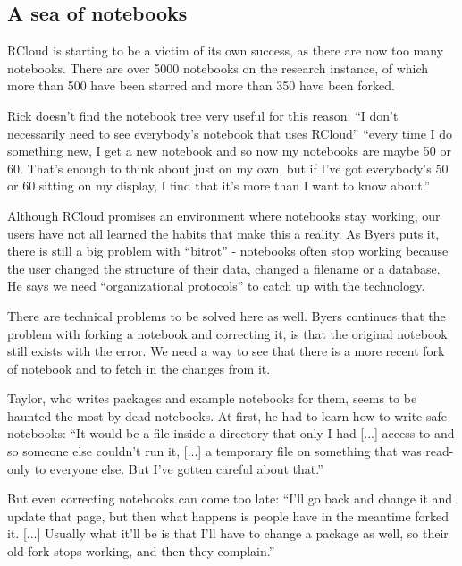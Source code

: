 

\subsection{A sea of notebooks}
RCloud is starting to be a victim of its own success, as there are now too many
notebooks.  There are over 5000 notebooks on the research instance, of which
more than 500 have been starred and more than 350 have been forked.

Rick doesn't find the notebook tree very useful for this reason: ``I
don't necessarily need to see everybody's notebook that uses RCloud'' ``every
time I do something new, I get a new notebook and so now my notebooks are maybe
50 or 60. That's enough to think about just on my own, but if I've got
everybody's 50 or 60 sitting on my display, I find that it's more than I want to
know about.''

Although RCloud promises an environment where notebooks stay working, our users
have not all learned the habits that make this a reality. As Byers puts it,
there is still a big problem with ``bitrot'' - notebooks often stop working
because the user changed the structure of their data, changed a filename or a
database.  He says we need ``organizational protocols'' to catch up with the
technology.

There are technical problems to be solved here as well. Byers continues that the
problem with forking a notebook and correcting it, is that the original notebook
still exists with the error.  We need a way to see that there is a more recent
fork of notebook and to fetch in the changes from it.

Taylor, who writes packages and example notebooks for them, seems to be
haunted the most by dead notebooks.  At first, he had to learn how to write safe
notebooks: ``It would be a file inside a directory that only I had [...] access
to and so someone else couldn't run it, [...] a temporary file on something that
was read-only to everyone else. But I've gotten careful about that.''

But even correcting notebooks can come too late: ``I'll go back and change it and update
that page, but then what happens is people have in the meantime forked it. [...]
Usually what it'll be is that I'll have to change a package as well, so
their old fork stops working, and then they complain.''

